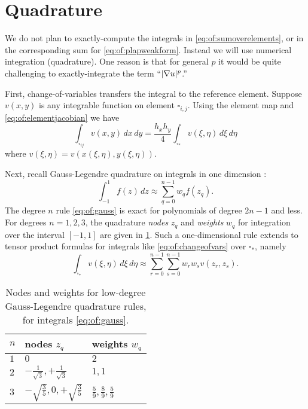 \section{Quadrature}

We do not plan to exactly-compute the integrals in \eqref{eq:of:sumoverelements}, or in the corresponding sum for \eqref{eq:of:plapweakform}.  Instead we will use numerical integration (quadrature).  One reason is that for general $p$ it would be quite challenging to exactly-integrate the term ``$|\nabla u|^p$.''

First, change-of-variables transfers the integral to the reference element.  Suppose $v(x,y)$ is any integrable function on element $\square_{i,j}$.  Using the element map and \eqref{eq:of:elementjacobian} we have
\begin{equation}
\int_{\square_{ij}} v(x,y)\,dx\,dy = \frac{h_x h_y}{4} \int_{\square_\ast} v(\xi,\eta) \,d\xi\,d\eta \label{eq:of:changeofvars}
\end{equation}
where $v(\xi,\eta)=v(x(\xi,\eta),y(\xi,\eta))$.

Next, recall Gauss-Legendre quadrature on integrals in one dimension \citep{GreenbaumChartier2012}:
\begin{equation}
\int_{-1}^1 f(z)\,dz \approx \sum_{q=0}^{n-1} w_q f(z_q).  \label{eq:of:gauss}
\end{equation}
The degree $n$ rule \eqref{eq:of:gauss} is exact for polynomials of degree $2n-1$ and less.  For degrees $n=1,2,3$, the quadrature \emph{nodes} $z_q$ and \emph{weights} $w_q$ for integration over the interval $[-1,1]$ are given in \ref{tab:of:gauss}.  Such a one-dimensional rule extends to tensor product formulas for integrals like \eqref{eq:of:changeofvars} over $\square_\ast$, namely
\begin{equation}
\int_{\square_\ast} v(\xi,\eta) \,d\xi\,d\eta \approx \sum_{r=0}^{n-1} \sum_{s=0}^{n-1} w_r w_s v(z_r,z_s).  \label{eq:of:tensorgauss}
\end{equation}

\begin{table}
\begin{tabular}{lll}
$n$\phantom{foobar} & nodes $z_q$\phantom{foo} & weights $w_q$ \\ \hline
$1$ & $0$ & $2$ \\
$2$ & $-\frac{1}{\sqrt{3}}, +\frac{1}{\sqrt{3}}$ & $1,1$ \\
$3$ & $-\sqrt{\frac{3}{5}}, 0, +\sqrt{\frac{3}{5}}$ & $\frac{5}{9}, \frac{8}{9}, \frac{5}{9}$ \\
\end{tabular}
\caption{Nodes and weights for low-degree Gauss-Legendre quadrature rules, for integrals \eqref{eq:of:gauss}.} \label{tab:of:gauss}
\end{table}

